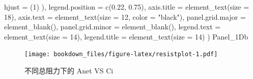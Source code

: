 \documentclass[
]{krantz}
\makeatletter
\newenvironment{Shaded}{\begin{snugshade}}{\end{snugshade}}
\newcommand{\AttributeTok}[1]{\textcolor[rgb]{0.77,0.63,0.00}{#1}}
\newcommand{\DecValTok}[1]{\textcolor[rgb]{0.00,0.00,0.81}{#1}}
\newcommand{\FloatTok}[1]{\textcolor[rgb]{0.00,0.00,0.81}{#1}}
\newcommand{\FunctionTok}[1]{\textcolor[rgb]{0.00,0.00,0.00}{#1}}
\newcommand{\NormalTok}[1]{#1}
\newcommand{\StringTok}[1]{\textcolor[rgb]{0.31,0.60,0.02}{#1}}
\newenvironment{kframe}{%
\medskip{}
\setlength{\fboxsep}{.8em}
 \def\at@end@of@kframe{}%
 \ifinner\ifhmode%
  \def\at@end@of@kframe{\end{minipage}}%
  \begin{minipage}{\columnwidth}%
 \fi\fi%
 \def\FrameCommand##1{\hskip\@totalleftmargin \hskip-\fboxsep
 \colorbox{shadecolor}{##1}\hskip-\fboxsep
     \hskip-\linewidth \hskip-\@totalleftmargin \hskip\columnwidth}%
 \MakeFramed {\advance\hsize-\width
   \@totalleftmargin\z@ \linewidth\hsize
   \@setminipage}}%
 {\par\unskip\endMakeFramed%
 \at@end@of@kframe}
\renewenvironment{Shaded}{\begin{kframe}}{\end{kframe}}
\makeatother
\begin{document}
\begin{Shaded}
\begin{Highlighting}[]
        \AttributeTok{hjust =}\NormalTok{ (}\DecValTok{1}\NormalTok{)}
\NormalTok{      ),}
    \AttributeTok{legend.position =} \FunctionTok{c}\NormalTok{(}\FloatTok{0.22}\NormalTok{, }\FloatTok{0.75}\NormalTok{),}
    \AttributeTok{axis.title =} \FunctionTok{element\_text}\NormalTok{(}\AttributeTok{size =} \DecValTok{18}\NormalTok{),}
    \AttributeTok{axis.text =} \FunctionTok{element\_text}\NormalTok{(}\AttributeTok{size =} \DecValTok{12}\NormalTok{, }\AttributeTok{color =} \StringTok{"black"}\NormalTok{),}
    \AttributeTok{panel.grid.major =} \FunctionTok{element\_blank}\NormalTok{(),}
    \AttributeTok{panel.grid.minor =} \FunctionTok{element\_blank}\NormalTok{(),}
    \AttributeTok{legend.text =} \FunctionTok{element\_text}\NormalTok{(}\AttributeTok{size =} \DecValTok{14}\NormalTok{),}
    \AttributeTok{legend.title =} \FunctionTok{element\_text}\NormalTok{(}\AttributeTok{size =} \DecValTok{14}\NormalTok{)}
\NormalTok{  )}
\NormalTok{Panel\_1Db}
\end{Highlighting}
\end{Shaded}

\begin{figure}
\centering
\texttt{[image: bookdown\_files/figure-latex/resistplot-1.pdf]}
\caption{\label{fig:resistplot}不同总阻力下的 Anet VS Ci}
\end{figure}
\end{document}

